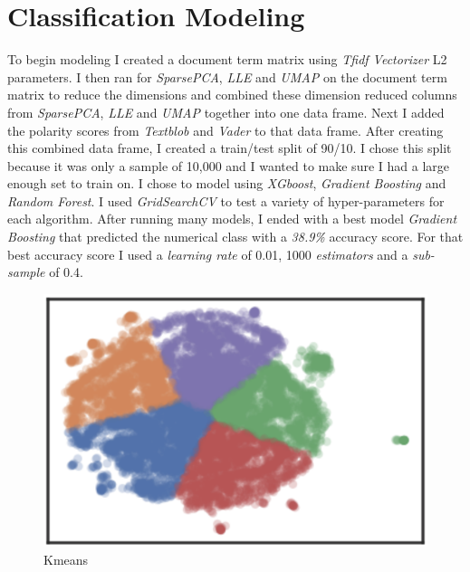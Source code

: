 \documentclass[a4paper, 11pt]{article}
\begin{document}
\section*{Classification Modeling}
To begin modeling I created a document term matrix using \emph{Tfidf Vectorizer} L2 parameters. I then ran for \emph{SparsePCA}, \emph{LLE} and \emph{UMAP} on the document term matrix to reduce the dimensions and combined these dimension reduced columns from \emph{SparsePCA}, \emph{LLE} and \emph{UMAP} together into one data frame. Next I added the polarity scores from \emph{Textblob} and \emph{Vader} to that data frame. After creating this combined data frame, I created a train/test split of 90/10. I chose this split because it was only a sample of 10,000 and I wanted to make sure I had a large enough set to train on. I chose to model using \emph{XGboost}, \emph{Gradient Boosting} and \emph{Random Forest}. I used \emph{GridSearchCV} to test a variety of hyper-parameters for each algorithm. After running many models, I ended with a best model \emph{Gradient Boosting} that predicted the numerical class with a \emph{38.9\%} accuracy score. For that best accuracy score I used a \emph{learning rate} of 0.01, 1000 \emph{estimators} and a \emph{sub-sample} of 0.4.

\begin{figure} %
    \centering
    \vspace{3mm}
    \caption{Kmeans}
    \includegraphics[width=\linewidth, trim=1 0 1 0,clip]{clusterkmeans.png}
\end{figure}
\end{document}
